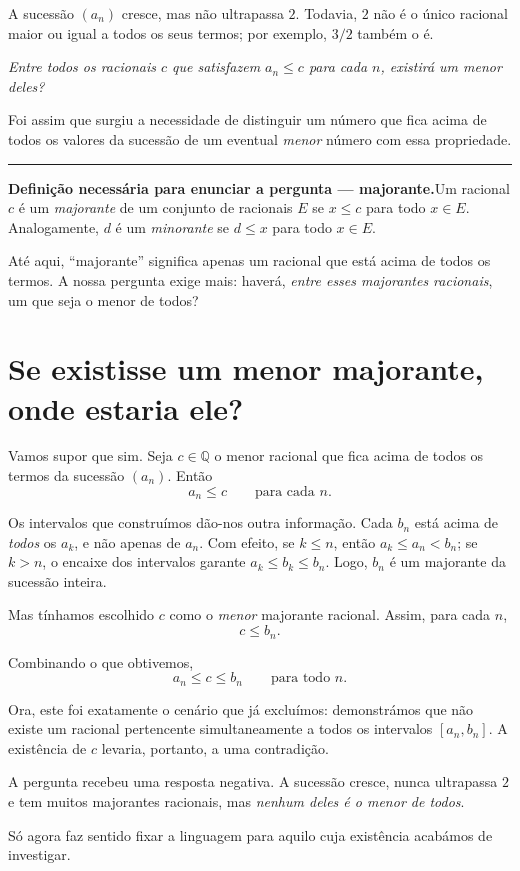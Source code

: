 \documentclass[11pt,a4paper]{article}
\newcommand{\Q}{\mathbb{Q}}
\newcommand{\questao}[1]{\par\medskip\noindent\textit{#1}\par\smallskip}
\newcommand{\assentado}[2]{%
\par\medskip\noindent\begingroup\color{azul}\rule{\linewidth}{0.45pt}\par\smallskip
\noindent\textbf{#1.}\enspace #2\par\endgroup\medskip}
\begin{document}
A sucessão $(a_n)$ cresce, mas não ultrapassa $2$. Todavia, $2$ não é o único racional maior ou igual a todos os seus termos; por exemplo, $3/2$ também o é.

\questao{Entre todos os racionais $c$ que satisfazem $a_n\le c$ para cada $n$, existirá um \emph{menor} deles?}

Foi assim que surgiu a necessidade de distinguir um número que fica acima de todos os valores da sucessão de um eventual \emph{menor} número com essa propriedade.

\assentado{Definição necessária para enunciar a pergunta --- majorante}{Um racional $c$ é um \emph{majorante} de um conjunto de racionais $E$ se $x\le c$ para todo $x\in E$. Analogamente, $d$ é um \emph{minorante} se $d\le x$ para todo $x\in E$.}

Até aqui, ``majorante'' significa apenas um racional que está acima de todos os termos. A nossa pergunta exige mais: haverá, \emph{entre esses majorantes racionais}, um que seja o menor de todos?

\section{Se existisse um menor majorante, onde estaria ele?}

Vamos supor que sim. Seja $c\in\Q$ o menor racional que fica acima de todos os termos da sucessão $(a_n)$. Então
\[
 a_n\le c \qquad\text{para cada }n.
\]

Os intervalos que construímos dão-nos outra informação. Cada $b_n$ está acima de \emph{todos} os $a_k$, e não apenas de $a_n$. Com efeito, se $k\le n$, então $a_k\le a_n<b_n$; se $k>n$, o encaixe dos intervalos garante $a_k\le b_k\le b_n$. Logo, $b_n$ é um majorante da sucessão inteira.

Mas tínhamos escolhido $c$ como o \emph{menor} majorante racional. Assim, para cada $n$,
\[
 c\le b_n.
\]

Combinando o que obtivemos,
\[
 \boxed{a_n\le c\le b_n\qquad\text{para todo }n.}
\]

Ora, este foi exatamente o cenário que já excluímos: demonstrámos que não existe um racional pertencente simultaneamente a todos os intervalos $[a_n,b_n]$. A existência de $c$ levaria, portanto, a uma contradição.

A pergunta recebeu uma resposta negativa. A sucessão cresce, nunca ultrapassa $2$ e tem muitos majorantes racionais, mas \emph{nenhum deles é o menor de todos}.

Só agora faz sentido fixar a linguagem para aquilo cuja existência acabámos de investigar.
\end{document}
